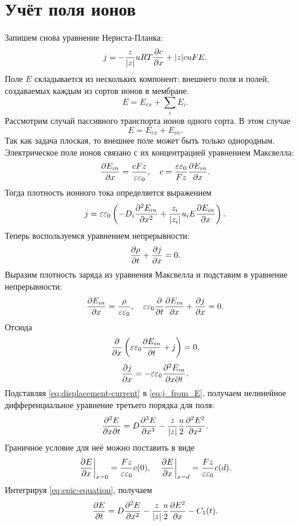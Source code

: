 \section{Учёт поля ионов}
    Запишем снова уравнение Нернста-Планка:
    \[
        j = -\frac{z}{|z|}uRT\frac{\partial c}{\partial x} + |z|cuFE.
    \]
    Поле \( E \) складывается из нескольких компонент: внешнего поля и полей,
    создаваемых каждым из сортов ионов в мембране.
    \[
        E = E_{ex} + \sum_{i} E_i.
    \]
    Рассмотрим случай пассивного транспорта ионов одного сорта. В этом случае
    \[
        E = E_{ex} + E_{in}.
    \]
    Так как задача плоская, то внешнее поле может быть только однородным.
    Электрическое поле ионов связано с их концентрацией уравнением Максвелла:
    \[
        \frac{\partial E_{in}}{\partial x} = \frac{cFz}{\varepsilon\varepsilon_0},\quad
        c = \frac{\varepsilon\varepsilon_0}{Fz}\frac{\partial E_{in}}{\partial x}.
    \]
    Тогда плотность ионного тока определяется выражением
    \begin{equation}
        j = \varepsilon\varepsilon_0
            \left(-D_i\frac{\partial^2 E_{in}}{\partial {x}^2}+\frac{z_i}{|z_i|}u_iE\frac{\partial E_{in}}{\partial x}\right).
        \label{eq:j_from_E}
    \end{equation}
    Теперь воспользуемся уравнением непрерывности:
    \[
        \frac{\partial \rho}{\partial t} + \frac{\partial j}{\partial x} = 0.
    \]
    Выразим плотность заряда из уравнения Максвелла и подставим в уравнение
    непрерывности:
    \[
        \frac{\partial E_{in}}{\partial x} = \frac{\rho}{\varepsilon\varepsilon_0},\quad
        \varepsilon\varepsilon_0\frac{\partial }{\partial t}\frac{\partial E_{in}}{\partial x} + \frac{\partial j}{\partial x} = 0.
    \]
    Отсюда
    \[
        \frac{\partial }{\partial x}\left(\varepsilon\varepsilon_0\frac{\partial E_{in}}{\partial t} + j\right) = 0,
    \]
    \begin{equation}
        \frac{\partial j}{\partial x} = -\varepsilon\varepsilon_0\frac{\partial^2 E_{in}}{\partial x \partial t}.
        \label{eq:displacement-current}
    \end{equation}
    Подставляя \eqref{eq:displacement-current} в \eqref{eq:j_from_E}, получаем
    нелинейное дифференциальное уравнение третьего порядка для поля:
    \begin{equation}
        \frac{\partial^2 E}{\partial x \partial t} = D\frac{\partial^3{E}}{\partial x^3} -
        \frac{z}{\left| z \right|}\frac{u}{2}\frac{\partial^2 E^2}{\partial {x}^2}.
        \label{eq:epic-equation}
    \end{equation}
    Граничное условие для неё можно поставить в виде
    \[
        \left.\frac{\partial E}{\partial x}\right|_{x=0} = \frac{Fz}{\varepsilon\varepsilon_0}c(0),\quad
        \left.\frac{\partial E}{\partial x}\right|_{x=d} = \frac{Fz}{\varepsilon\varepsilon_0}c(d).
    \]
    Интегрируя \eqref{eq:epic-equation}, получаем
    \begin{equation}
        \frac{\partial E}{\partial t} = D\frac{\partial^2 E}{\partial {x}^2} -
        \frac{z}{\left| z \right|}\frac{u}{2}\frac{\partial E^2}{\partial x} - C_1(t).
        \label{eq:epic-integrated}
    \end{equation}
